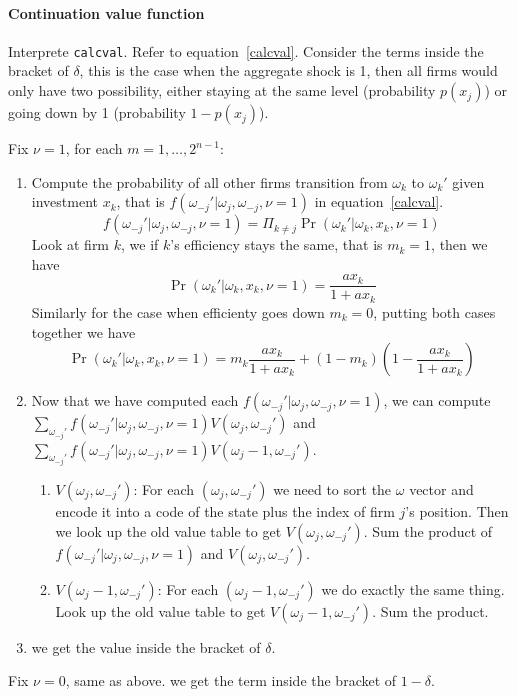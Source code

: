 \documentclass[12pt]{article}[margin=1in]
\begin{document}
\paragraph{Continuation value function} Interprete \verb|calcval|.
Refer to equation~\ref{calcval}. Consider the terms inside the bracket of $\delta$, this is the case when the aggregate shock is 1, then all firms would only have two possibility, either staying at the same level (probability $p(x_j)$) or going down by 1 (probability $1-p(x_j)$). 

Fix $\nu=1$, for each \(m = 1, \dots, 2^{n-1}\):
\begin{enumerate}
    \item Compute the probability of all other firms transition from $\omega_k$ to $\omega_k'$ given investment $x_k$, that is $f(\omega_{-j}'|\omega_j,\omega_{-j},\nu=1)$ in equation~\ref{calcval}.
$$f(\omega_{-j}'|\omega_j,\omega_{-j},\nu=1)=\Pi_{k\neq j}\Pr(\omega_k'|\omega_k,x_k,\nu=1)$$
Look at firm $k$, we if $k$'s efficiency stays the same, that is $m_k=1$, then we have 
$$\Pr(\omega_k'|\omega_k,x_k,\nu=1)=\frac{ax_k}{1+ax_k}$$
Similarly for the case when efficienty goes down $m_k=0$, putting both cases together we have
$$\Pr(\omega_k'|\omega_k,x_k,\nu=1)=m_k\frac{ax_k}{1+ax_k}+(1-m_k)(1-\frac{ax_k}{1+ax_k})$$
\item Now that we have computed each $f(\omega_{-j}'|\omega_j,\omega_{-j},\nu=1)$, we can compute $\sum_{\omega_{-j}'}f(\omega_{-j}'|\omega_j,\omega_{-j},\nu=1)V(\omega_j, \omega_{-j}')$ and $\sum_{\omega_{-j}'}f(\omega_{-j}'|\omega_j,\omega_{-j},\nu=1)V(\omega_j-1, \omega_{-j}')$. 
\begin{enumerate}
    \item $V(\omega_j, \omega_{-j}')$: For each $(\omega_j, \omega_{-j}')$ we need to sort the $\omega$ vector and encode it into a code of the state plus the index of firm $j$'s position. Then we look up the old value table to get $V(\omega_j, \omega_{-j}')$. Sum the product of $f(\omega_{-j}'|\omega_j,\omega_{-j},\nu=1)$ and $V(\omega_j, \omega_{-j}')$.
    \item $V(\omega_j-1, \omega_{-j}')$: For each $(\omega_j-1, \omega_{-j}')$ we do exactly the same thing. Look up the old value table to get $V(\omega_j-1, \omega_{-j}')$. Sum the product.
\end{enumerate}
\item we get the value inside the bracket of $\delta$.
\end{enumerate}

Fix $\nu=0$, same as above. we get the term inside the bracket of $1-\delta$. 
\end{document}
